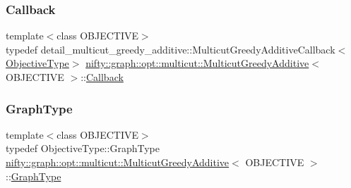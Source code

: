 \mbox{\label{classnifty_1_1graph_1_1opt_1_1multicut_1_1MulticutGreedyAdditive_ab933555fd4465da634c47187ccadc56e}} 
\subsubsection{\texorpdfstring{Callback}{Callback}}
{\footnotesize\ttfamily template$<$class O\+B\+J\+E\+C\+T\+I\+VE$>$ \\
typedef detail\+\_\+multicut\+\_\+greedy\+\_\+additive\+::\+Multicut\+Greedy\+Additive\+Callback$<$\hyperlink{classnifty_1_1graph_1_1opt_1_1multicut_1_1MulticutGreedyAdditive_a20bb4420504be890fcb487d70fa51dc0}{Objective\+Type}$>$ \hyperlink{classnifty_1_1graph_1_1opt_1_1multicut_1_1MulticutGreedyAdditive}{nifty\+::graph\+::opt\+::multicut\+::\+Multicut\+Greedy\+Additive}$<$ O\+B\+J\+E\+C\+T\+I\+VE $>$\+::\hyperlink{classnifty_1_1graph_1_1opt_1_1multicut_1_1MulticutGreedyAdditive_ab933555fd4465da634c47187ccadc56e}{Callback}}

\mbox{\label{classnifty_1_1graph_1_1opt_1_1multicut_1_1MulticutGreedyAdditive_a16d23f12f0e53d32e27b273f9f4c8198}} 
\subsubsection{\texorpdfstring{Graph\+Type}{GraphType}}
{\footnotesize\ttfamily template$<$class O\+B\+J\+E\+C\+T\+I\+VE$>$ \\
typedef Objective\+Type\+::\+Graph\+Type \hyperlink{classnifty_1_1graph_1_1opt_1_1multicut_1_1MulticutGreedyAdditive}{nifty\+::graph\+::opt\+::multicut\+::\+Multicut\+Greedy\+Additive}$<$ O\+B\+J\+E\+C\+T\+I\+VE $>$\+::\hyperlink{classnifty_1_1graph_1_1opt_1_1multicut_1_1MulticutGreedyAdditive_a16d23f12f0e53d32e27b273f9f4c8198}{Graph\+Type}}


